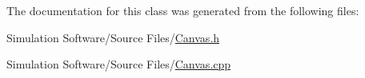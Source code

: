 The documentation for this class was generated from the following files\+:\begin{DoxyCompactItemize}
\item 
Simulation Software/\+Source Files/\hyperlink{_canvas_8h}{Canvas.\+h}\item 
Simulation Software/\+Source Files/\hyperlink{_canvas_8cpp}{Canvas.\+cpp}\end{DoxyCompactItemize}

